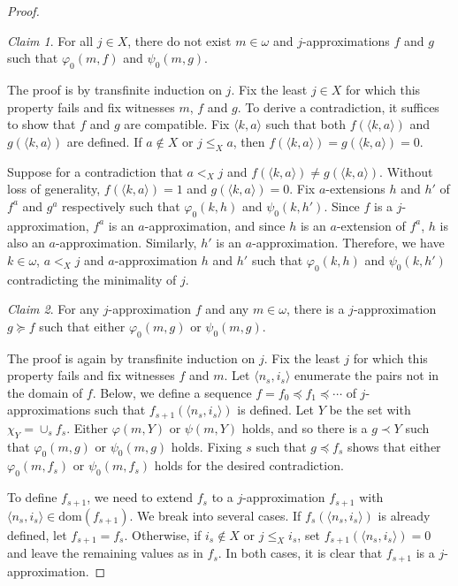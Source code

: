 \documentclass{amsart}
\theoremstyle{definition}
\theoremstyle{remark}
\newtheorem*{claim}{Claim}
\begin{document}
\begin{proof}
\begin{claim}
For all $j \in X$, there do not exist $m \in \omega$ and $j$-approximations $f$ and $g$ such that $\varphi_0(m,f)$ and $\psi_0(m,g)$.  
\end{claim}

The proof is by transfinite induction on $j$. Fix the least $j \in X$ for which this property fails and fix witnesses $m$, $f$ and $g$. To derive a contradiction, 
it suffices to show that $f$ and $g$ are compatible. Fix $\langle k,a \rangle$ such that both $f(\langle k,a \rangle)$ and $g(\langle k,a \rangle)$ are defined. If $a \not \in X$ 
or $j \leq_X a$, then $f(\langle k,a \rangle) = g(\langle k,a \rangle) = 0$. 

Suppose for a contradiction that $a <_X j$ and $f(\langle k,a \rangle) \neq g(\langle k,a \rangle)$. Without loss of generality, $f(\langle k,a \rangle) = 1$ and 
$g(\langle k,a \rangle) = 0$. Fix $a$-extensions $h$ and $h'$ of $f^a$ and $g^a$ respectively such that $\varphi_0(k,h)$ and $\psi_0(k,h')$. 
Since $f$ is a $j$-approximation, $f^a$ is an $a$-approximation, and since $h$ is an $a$-extension of $f^a$, $h$ is also an $a$-approximation. Similarly, $h'$ is an 
$a$-approximation. Therefore, we have $k \in \omega$, $a <_X j$ and $a$-approximation $h$ and $h'$ such that $\varphi_0(k,h)$ and $\psi_0(k,h')$ contradicting the 
minimality of $j$.

\begin{claim}
For any $j$-approximation $f$ and any $m \in \omega$, there is a $j$-approximation $g \succeq f$ such that either $\varphi_0(m,g)$ or $\psi_0(m,g)$. 
\end{claim}

The proof is again by transfinite induction on $j$. Fix the least $j$ for which this property fails and fix witnesses $f$ and $m$. Let $\langle n_s,i_s \rangle$ enumerate 
the pairs not in the domain of $f$. Below, we define a sequence $f=f_0 \preceq f_1 \preceq \cdots$ of $j$-approximations such that $f_{s+1}(\langle n_s,i_s \rangle)$ is 
defined. Let $Y$ be the set with $\chi_Y = \cup_s f_s$. Either $\varphi(m,Y)$ or $\psi(m,Y)$ holds, and so 
there is a $g \prec Y$ such that $\varphi_0(m,g)$ or $\psi_0(m,g)$ holds. Fixing $s$ such that $g \preceq f_s$ shows that either $\varphi_0(m,f_s)$ or $\psi_0(m,f_s)$ 
holds for the desired contradiction. 

To define $f_{s+1}$, we need to extend $f_s$ to a $j$-approximation $f_{s+1}$ with $\langle n_s,i_s \rangle \in \text{dom}(f_{s+1})$. We break into several cases. 
If $f_s(\langle n_s,i_s \rangle)$ is already defined, let $f_{s+1} = f_s$. Otherwise, if $i_s \not \in X$ or $j \leq_X i_s$, set $f_{s+1}(\langle n_s,i_s \rangle) = 0$ and leave 
the remaining values as in $f_s$. In both cases, it is clear that $f_{s+1}$ is a $j$-approximation.


\end{proof}
\end{document}
